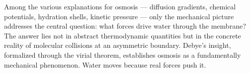 Among the various explanations for osmosis — diffusion gradients, chemical potentials, hydration shells, kinetic pressure — only the mechanical picture addresses the central question: what forces drive water through the membrane? The answer lies not in abstract thermodynamic quantities but in the concrete reality of molecular collisions at an asymmetric boundary. Debye's insight, formalized through the virial theorem, establishes osmosis as a fundamentally mechanical phenomenon. Water moves because real forces push it.



